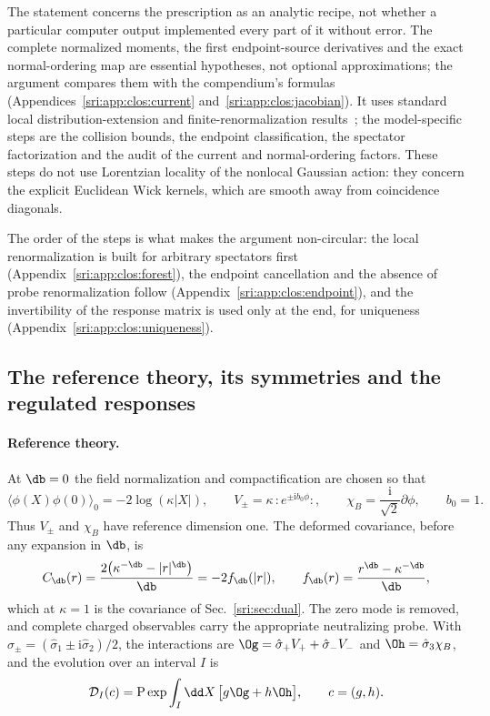 The statement concerns the prescription as an analytic recipe, not whether a particular computer output implemented
every part of it without error. The complete normalized moments, the first endpoint-source derivatives and the exact
normal-ordering map are essential hypotheses, not optional approximations; the argument compares them with the
compendium's formulas (Appendices~\ref{sri:app:clos:current} and~\ref{sri:app:clos:jacobian}). It uses standard local
distribution-extension and finite-renormalization results~\cite{sri:Brunetti:2000,sri:Brunetti:2009}; the model-specific
steps are the collision bounds, the endpoint classification, the spectator factorization and the audit of the
current and normal-ordering factors. These steps do not use Lorentzian locality of the nonlocal Gaussian action: they
concern the explicit Euclidean Wick kernels, which are smooth away from coincidence diagonals.

The order of the steps is what makes the argument non-circular: the local renormalization is built for arbitrary
spectators first (Appendix~\ref{sri:app:clos:forest}), the endpoint cancellation and the absence of probe renormalization
follow (Appendix~\ref{sri:app:clos:endpoint}), and the invertibility of the response matrix is used only at the end, for
uniqueness (Appendix~\ref{sri:app:clos:uniqueness}).

\subsection{The reference theory, its symmetries and the regulated responses}\label{sri:app:clos:reference}
\paragraph{Reference theory.} At $\db=0$ the field normalization and compactification are chosen so that
\begin{equation}
 \langle\phi(X)\phi(0)\rangle_0=-2\log(\kappa|X|),\qquad
 V_\pm=\kappa\,{:}e^{\pm\mathrm i b_0\phi}{:},\qquad
 \chi_B=\frac{\mathrm i}{\sqrt2}\partial\phi,\qquad b_0=1.
 \label{sri:eq:clos:reference}
\end{equation}
Thus $V_\pm$ and $\chi_B$ have reference dimension one. The deformed covariance, before any expansion in $\db$, is
\begin{equation}
 C_{\db}(r)=\frac{2\bigl(\kappa^{-\db}-|r|^{\db}\bigr)}{\db}=-2f_{\db}(|r|),\qquad
 f_{\db}(r)=\frac{r^{\db}-\kappa^{-\db}}{\db},
 \label{sri:eq:clos:cov}
\end{equation}
which at $\kappa=1$ is the covariance of Sec.~\ref{sri:sec:dual}. The zero mode is removed, and complete charged
observables carry the appropriate neutralizing probe. With $\hat\sigma_\pm=(\hat\sigma_1\pm\mathrm i\hat\sigma_2)/2$,
the interactions are $\Og=\hat\sigma_+V_++\hat\sigma_-V_-$ and $\Oh=\hat\sigma_3\chi_B$, and the evolution over an
interval $I$ is
\begin{equation}
 \mathcal D_I(c)=\mathrm P\exp\int_I\dd X\,\bigl[g\Og+h\Oh\bigr],\qquad c=(g,h).
 \label{sri:eq:clos:interaction}
\end{equation}

